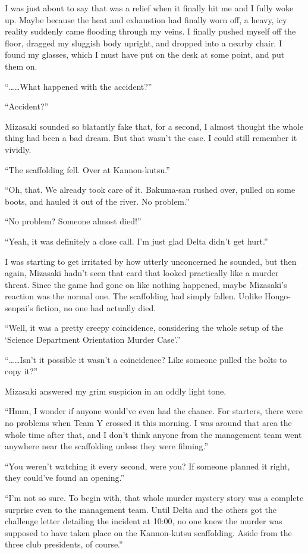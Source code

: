\documentclass[
    a4paper,
    12pt,
    twoside,
    openany,
    UTF8,
    fontset=windows
]{ctexbook}
\begin{document}
I was just about to say that was a relief when it finally hit me and I fully woke up. Maybe because the heat and exhaustion had finally worn off, a heavy, icy reality suddenly came flooding through my veins. I finally pushed myself off the floor, dragged my sluggish body upright, and dropped into a nearby chair. I found my glasses, which I must have put on the desk at some point, and put them on.

``\dots\dots What happened with the accident?''

``Accident?''

Mizasaki sounded so blatantly fake that, for a second, I almost thought the whole thing had been a bad dream. But that wasn't the case. I could still remember it vividly.

``The scaffolding fell. Over at Kannon-kutsu.''

``Oh, that. We already took care of it. Bakuma-san rushed over, pulled on some boots, and hauled it out of the river. No problem.''

``No problem? Someone almost died!''

``Yeah, it was definitely a close call. I'm just glad Delta didn't get hurt.''

I was starting to get irritated by how utterly unconcerned he sounded, but then again, Mizasaki hadn't seen that card that looked practically like a murder threat. Since the game had gone on like nothing happened, maybe Mizasaki's reaction was the normal one. The scaffolding had simply fallen. Unlike Hongo-senpai's fiction, no one had actually died.

``Well, it was a pretty creepy coincidence, considering the whole setup of the `Science Department Orientation Murder Case'.''

``\dots\dots Isn't it possible it wasn't a coincidence? Like someone pulled the bolts to copy it?''

Mizasaki answered my grim suspicion in an oddly light tone.

``Hmm, I wonder if anyone would've even had the chance. For starters, there were no problems when Team Y crossed it this morning. I was around that area the whole time after that, and I don't think anyone from the management team went anywhere near the scaffolding unless they were filming.''

``You weren't watching it every second, were you? If someone planned it right, they could've found an opening.''

``I'm not so sure. To begin with, that whole murder mystery story was a complete surprise even to the management team. Until Delta and the others got the challenge letter detailing the incident at 10:00, no one knew the murder was supposed to have taken place on the Kannon-kutsu scaffolding. Aside from the three club presidents, of course.''
\end{document}
